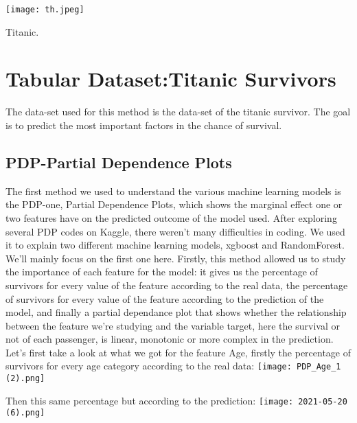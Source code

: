\documentclass[sigplan,screen]{acmart}
\begin{document}
\begin{teaserfigure}
  \texttt{[image: th.jpeg]}
  \caption{Titanic.}
  \label{fig:teaser}
\end{teaserfigure}


\maketitle

\section{Tabular Dataset:Titanic Survivors}
\large
The data-set used for this method is the data-set of the titanic survivor. The goal is to predict the most important factors in the chance of survival.
\subsection{PDP-Partial Dependence Plots}
\large
The first method we used to understand the various machine learning models is the PDP-one, Partial Dependence Plots, which shows the marginal effect one or two features have on the predicted outcome of the model used. After exploring several PDP codes on Kaggle, there weren't many difficulties in coding.
We used it to explain two different machine learning models, xgboost and RandomForest. We'll mainly focus on the first one here.
Firstly, this method allowed us to study the importance of each feature for the model: it gives us the percentage of survivors for every value of the feature according to the real data, the percentage of survivors for every value of the feature according to the prediction of the model, and finally a partial dependance plot that shows whether the relationship between the feature we're studying and the variable target, here the survival or not of each passenger, is linear, monotonic or more complex in the prediction.
Let's first take a look at what we got for the feature Age, firstly the percentage of survivors for every age category according to the real data:
\centering
      \texttt{[image: PDP\_Age\_1 (2).png]}

Then this same percentage but according to the prediction:
\centering
      \texttt{[image: 2021-05-20 (6).png]}
      
\end{document}
